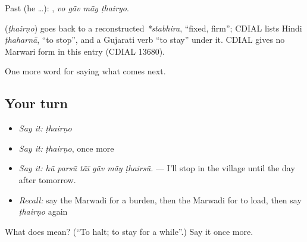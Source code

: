 Past (he …):    , \emph{vo gā̃v mā̃y ṭhairyo}.

\begin{cousinweb}
\textbf{} (\emph{ṭhairṇo}) goes back to a reconstructed \emph{*stabhira}, \textquotedblleft{}fixed, firm\textquotedblright{}; CDIAL lists Hindi \emph{ṭhaharnā}, \textquotedblleft{}to stop\textquotedblright{}, and a Gujarati verb \textquotedblleft{}to stay\textquotedblright{} under it. CDIAL gives no Marwari form in this entry (CDIAL 13680).
\end{cousinweb}

\begin{grammarlens}[title={What you've built}]
One more word for saying what comes next.
\end{grammarlens}

\subsection*{Your turn}
\begin{itemize}
\raggedright
  \item \emph{Say it:} \emph{ṭhairṇo}
  \item \emph{Say it:} \emph{ṭhairṇo}, once more
  \item \emph{Say it:} \emph{hū̃ parsū̃ tā̃ī gā̃v mā̃y ṭhairsū̃.} — I'll stop in the village until the day after tomorrow.
  \item \emph{Recall:} say the Marwadi for a burden, then the Marwadi for to load, then say \emph{ṭhairṇo} again
\end{itemize}

\begin{tcolorbox}[breakable,colback=teal!4,colframe=teal!35!black,title={Before you move on}]
What does  mean? (\textquotedblleft{}To halt; to stay for a while\textquotedblright{}.) Say it once more.
\end{tcolorbox}
